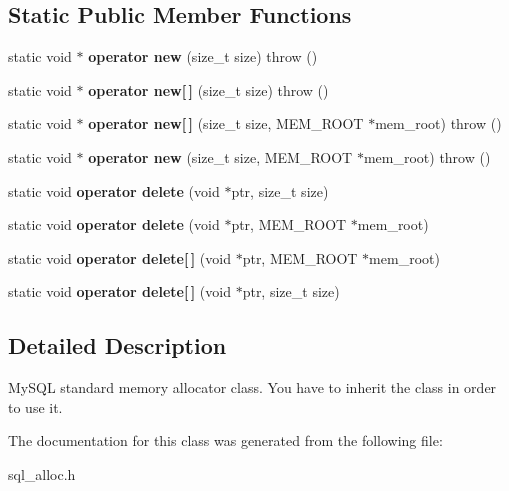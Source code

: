 \subsection*{Static Public Member Functions}
\begin{DoxyCompactItemize}
\item 
\mbox{\label{classSql__alloc_a193100cab44074df6f4f1507b333dcda}} 
static void $\ast$ {\bfseries operator new} (size\+\_\+t size)  throw ()
\item 
\mbox{\label{classSql__alloc_a14b17bd7ec22fc7a7e5b56702e5630a6}} 
static void $\ast$ {\bfseries operator new\mbox{[}$\,$\mbox{]}} (size\+\_\+t size)  throw ()
\item 
\mbox{\label{classSql__alloc_a13f2eacbb6adcee5c9ac94629e2863b3}} 
static void $\ast$ {\bfseries operator new\mbox{[}$\,$\mbox{]}} (size\+\_\+t size, M\+E\+M\+\_\+\+R\+O\+OT $\ast$mem\+\_\+root)  throw ()
\item 
\mbox{\label{classSql__alloc_a06adbd3404f702994fd10619c41267f0}} 
static void $\ast$ {\bfseries operator new} (size\+\_\+t size, M\+E\+M\+\_\+\+R\+O\+OT $\ast$mem\+\_\+root)  throw ()
\item 
\mbox{\label{classSql__alloc_a1e428ed5b826482a49b1d8a1d246a579}} 
static void {\bfseries operator delete} (void $\ast$ptr, size\+\_\+t size)
\item 
\mbox{\label{classSql__alloc_a7c08622003a34134a56eccaf2d95c0b9}} 
static void {\bfseries operator delete} (void $\ast$ptr, M\+E\+M\+\_\+\+R\+O\+OT $\ast$mem\+\_\+root)
\item 
\mbox{\label{classSql__alloc_ab0c7ed4b5a1eb798f3af463eb84b1e3b}} 
static void {\bfseries operator delete\mbox{[}$\,$\mbox{]}} (void $\ast$ptr, M\+E\+M\+\_\+\+R\+O\+OT $\ast$mem\+\_\+root)
\item 
\mbox{\label{classSql__alloc_a6dd86b56cecc3919504cf5e1452f2511}} 
static void {\bfseries operator delete\mbox{[}$\,$\mbox{]}} (void $\ast$ptr, size\+\_\+t size)
\end{DoxyCompactItemize}


\subsection{Detailed Description}
My\+S\+QL standard memory allocator class. You have to inherit the class in order to use it. 

The documentation for this class was generated from the following file\+:\begin{DoxyCompactItemize}
\item 
sql\+\_\+alloc.\+h\end{DoxyCompactItemize}
